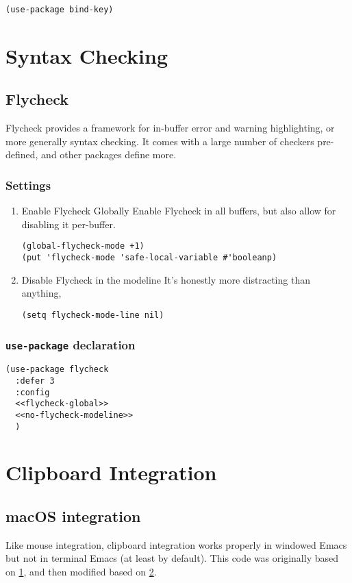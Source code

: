 \documentclass[11pt]{article}
\begin{document}
\begin{verbatim}
(use-package bind-key)
\end{verbatim}
\section{Syntax Checking}
\label{sec:org1e8b7d3}
\subsection{Flycheck}
\label{sec:orgafdea54}
Flycheck provides a framework for in-buffer error and warning
highlighting, or more generally syntax checking. It comes with a large
number of checkers pre-defined, and other packages define more.

\subsubsection{Settings}
\label{sec:orgacdc45e}
\begin{enumerate}
\item Enable Flycheck Globally
\label{sec:orge6ca2d5}
Enable Flycheck in all buffers, but also allow for disabling it
per-buffer.

\begin{verbatim}
(global-flycheck-mode +1)
(put 'flycheck-mode 'safe-local-variable #'booleanp)
\end{verbatim}

\item Disable Flycheck in the modeline
\label{sec:org27ade91}
It's honestly more distracting than anything,

\begin{verbatim}
(setq flycheck-mode-line nil)
\end{verbatim}
\end{enumerate}

\subsubsection{\texttt{use-package} declaration}
\label{sec:orgfa5d416}
\begin{verbatim}
(use-package flycheck
  :defer 3
  :config
  <<flycheck-global>>
  <<no-flycheck-modeline>>
  )
\end{verbatim}
\section{Clipboard Integration}
\label{sec:org2cad67e}
\subsection{macOS integration}
\label{sec:org426ecc6}
Like mouse integration, clipboard integration
works properly in windowed Emacs but not in terminal Emacs (at
least by default). This code was originally based on \href{https://gist.github.com/the-kenny/267162}{1}, and then
modified based on \href{http://emacs.stackexchange.com/q/26471/12534}{2}.
\end{document}
